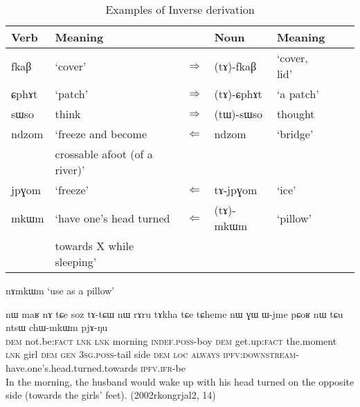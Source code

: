\documentclass[oldfontcommands,oneside,a4paper,11pt]{article}
\newcommand{\ipa}[1]{{\phon \mbox{#1}}} %
\begin{document}
\begin{table}[H]
\caption{Examples of Inverse derivation} \centering \label{tab:rueckbildung}
\begin{tabular}{lllllll}
\toprule
Verb & Meaning &&Noun & Meaning\\
\midrule
\ipa{fkaβ} & `cover' & $\Rightarrow$ &\ipa{(tɤ)-fkaβ} &`cover, lid' \\
\ipa{ɕphɤt} & `patch'& $\Rightarrow$ &\ipa{(tɤ)-ɕphɤt} & `a patch'  \\
\ipa{sɯso} & think &  $\Rightarrow$ & \ipa{(tɯ)-sɯso} & thought \\
\midrule
\ipa{ndzom} & `freeze and become   &$\Leftarrow$ &\ipa{ndzom} &`bridge' \\
&crossable afoot (of a river)'&&&\\
\ipa{jpɣom} & `freeze' & $\Leftarrow$ &\ipa{tɤ-jpɣom}& `ice' \\
\ipa{mkɯm} & `have one's head turned& $\Leftarrow$ &\ipa{(tɤ)-mkɯm}& `pillow' \\
&   towards X while sleeping' &&&\\
\bottomrule
\end{tabular}
\end{table}

\ipa{nɤmkɯm} `use as a pillow'


\begin{exe}
\ex
\gll 
\ipa{nɯ}  	\ipa{maʁ}  	\ipa{nɤ}  \ipa{tɕe}   \ipa{soz}  	\ipa{tɤ-tɕɯ}  	\ipa{nɯ}  	\ipa{rɤru}  	\ipa{tɤkha}  	\ipa{tɕe}   	\ipa{tɕheme}  	\ipa{nɯ}  	\ipa{ɣɯ}  	\ipa{ɯ-jme}  	\ipa{pɕoʁ}  	\ipa{nɯ}  	\ipa{tɕu}  	\ipa{ntsɯ}  	\ipa{chɯ-mkɯm}  	\ipa{pjɤ-ŋu}   \\
\textsc{dem} not.be:\textsc{fact} \textsc{lnk} \textsc{lnk} morning \textsc{indef.poss}-boy \textsc{dem}  get.up:\textsc{fact} the.moment \textsc{lnk} girl \textsc{dem} \textsc{gen} \textsc{3sg.poss}-tail side \textsc{dem} \textsc{loc} \textsc{always} \textsc{ipfv:downstream}-have.one's.head.turned.towards \textsc{ipfv.ifr}-be \\
\glt In the morning, the husband would wake up with his head turned on the opposite side (towards the girls' feet). (2002rkongrjal2, 14)
\end{exe}
\end{document}
